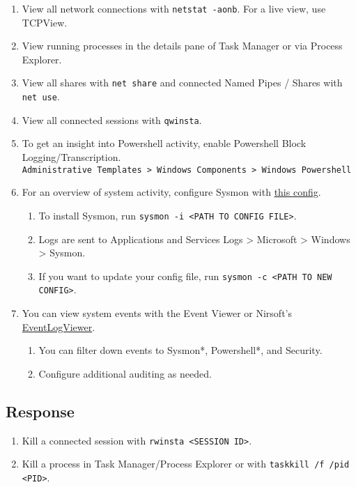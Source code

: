 \documentclass[12pt,letterpaper]{article}
\def\code#1{\textcolor{iris}{\texttt{#1}}}
\begin{document}
\begin{enumerate}
	\item View all network connections with \code{netstat -aonb}. For a live view, use TCPView.
	\item View running processes in the details pane of Task Manager or via Process Explorer.
	\item View all shares with \code{net share} and connected Named Pipes / Shares with \code{net use}.
	\item View all connected sessions with \code{qwinsta}.
	\item To get an insight into Powershell activity, enable Powershell Block Logging/Transcription. \\
		\code{Administrative Templates > Windows Components > Windows Powershell}
	\item For an overview of system activity, configure Sysmon with \href{https://raw.githubusercontent.com/D42H5/cyber\_comp\_resources/main/sysmonconfig-export-modified-2-2-24.xml}{this config}.
	\begin{enumerate}
		\item To install Sysmon, run \code{sysmon -i <PATH TO CONFIG FILE>}.
		\item Logs are sent to Applications and Services Logs > Microsoft > Windows > Sysmon.
		\item If you want to update your config file, run \code{sysmon -c <PATH TO NEW CONFIG>}.
	\end{enumerate}
	\item You can view system events with the Event Viewer or Nirsoft's \href{https://www.nirsoft.net/utils/fulleventlogview-x64.zip}{EventLogViewer}.
	\begin{enumerate}
		\item You can filter down events to Sysmon*, Powershell*, and Security.
		\item Configure additional auditing as needed.
	\end{enumerate}
\end{enumerate}

\subsection{Response}

\begin{enumerate}
	\item Kill a connected session with \code{rwinsta <SESSION ID>}.
	\item Kill a process in Task Manager/Process Explorer or with \code{taskkill /f /pid <PID>}.
\end{enumerate}
\end{document}

